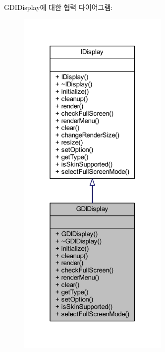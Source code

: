 G\+D\+I\+Display에 대한 협력 다이어그램\+:\nopagebreak
\begin{figure}[H]
\begin{center}
\leavevmode
\includegraphics[width=208pt]{class_g_d_i_display__coll__graph}
\end{center}
\end{figure}
